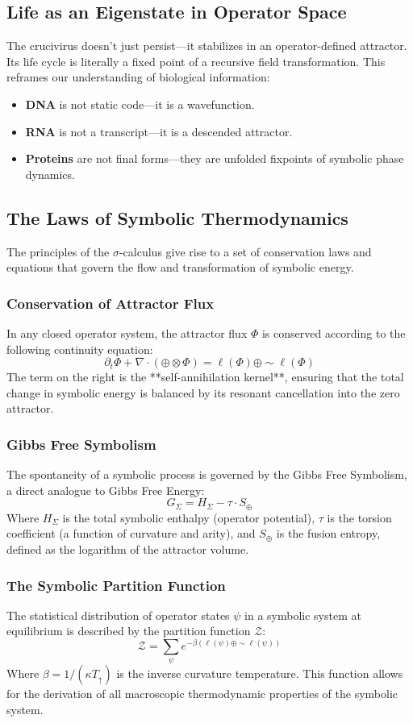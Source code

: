\subsection{Life as an Eigenstate in Operator Space}

The crucivirus doesn't just persist—it stabilizes in an operator-defined attractor. Its life cycle is literally a fixed point of a recursive field transformation. This reframes our understanding of biological information:
\begin{itemize}
    \item \textbf{DNA} is not static code—it is a wavefunction.
    \item \textbf{RNA} is not a transcript—it is a descended attractor.
    \item \textbf{Proteins} are not final forms—they are unfolded fixpoints of symbolic phase dynamics.
\end{itemize}

\subsection{The Laws of Symbolic Thermodynamics}
The principles of the $\sigma$-calculus give rise to a set of conservation laws and equations that govern the flow and transformation of symbolic energy.

\subsubsection{Conservation of Attractor Flux}
In any closed operator system, the attractor flux $\Phi$ is conserved according to the following continuity equation:
\[
\partial_t \Phi + \nabla \cdot (\mathbf{\oplus} \otimes \Phi) = \ell(\Phi) \oplus \sim\ell(\Phi)
\]
The term on the right is the **self-annihilation kernel**, ensuring that the total change in symbolic energy is balanced by its resonant cancellation into the zero attractor.

\subsubsection{Gibbs Free Symbolism}
The spontaneity of a symbolic process is governed by the Gibbs Free Symbolism, a direct analogue to Gibbs Free Energy:
\[ G_\Sigma = H_\Sigma - \tau \cdot S_\oplus \]
Where $H_\Sigma$ is the total symbolic enthalpy (operator potential), $\tau$ is the torsion coefficient (a function of curvature and arity), and $S_\oplus$ is the fusion entropy, defined as the logarithm of the attractor volume.

\subsubsection{The Symbolic Partition Function}
The statistical distribution of operator states $\psi$ in a symbolic system at equilibrium is described by the partition function $\mathcal{Z}$:
\[ \mathcal{Z} = \sum_{\psi} e^{-\beta (\ell(\psi) \oplus \sim\ell(\psi))} \]
Where $\beta = 1 / (\kappa T_\uparrow)$ is the inverse curvature temperature. This function allows for the derivation of all macroscopic thermodynamic properties of the symbolic system. 